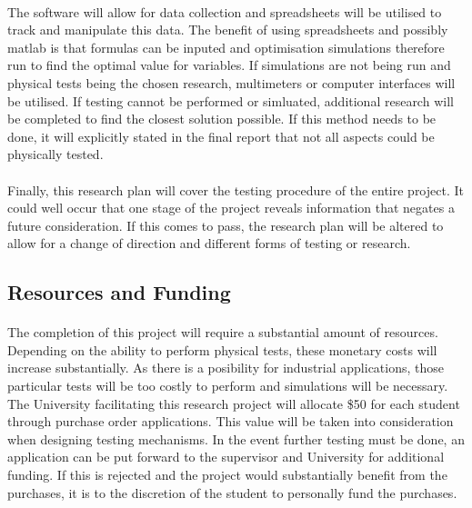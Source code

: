 \paragraph{} 
The software will allow for data collection and spreadsheets will be utilised to track and manipulate this data. The benefit of using spreadsheets and possibly matlab is that formulas can be inputed and optimisation simulations therefore run to find the optimal value for variables. If simulations are not being run and physical tests being the chosen research, multimeters or computer interfaces will be utilised. If testing cannot be performed or simluated, additional research will be completed to find the closest solution possible. If this method needs to be done, it will explicitly stated in the final report that not all aspects could be physically tested.

\paragraph{}
Finally, this research plan will cover the testing procedure of the entire project. It could well occur that one stage of the project reveals information that negates a future consideration. If this comes to pass, the research plan will be altered to allow for a change of direction and different forms of testing or research.      


\subsection{Resources and Funding}

\paragraph{}
The completion of this project will require a substantial amount of resources. Depending on the ability to perform physical tests, these monetary costs will increase substantially. As there is a posibility for industrial applications, those particular tests will be too costly to perform and simulations will be necessary. The University facilitating this research project will allocate \$50 for each student through purchase order applications. This value will be taken into consideration when designing testing mechanisms. In the event further testing must be done, an application can be put forward to the supervisor and University for additional funding. If this is rejected and the project would substantially benefit from the purchases, it is to the discretion of the student to personally fund the purchases. 

